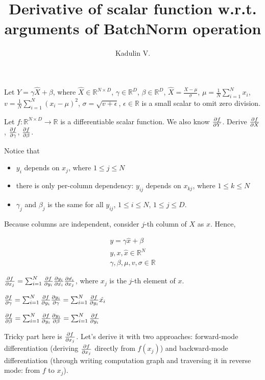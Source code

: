 \documentclass[12pt]{article}
\begin{document}
\title{Derivative of scalar function w.r.t. arguments of BatchNorm operation}
\author{Kadulin V.}
\maketitle

Let $Y = \gamma \hat{X} + \beta$, where 
$\hat{X} \in \mathbb{R}^{N \times D}$, 
$\gamma \in \mathbb{R}^D$, 
$\beta \in \mathbb{R}^D$, 
$\hat{X} = \frac{X - \mu}{\sigma}$,  
$\mu = \frac{1}{N} \sum_{i=1}^{N} x_{i}$,
$v = \frac{1}{N} \sum_{i=1}^{N} (x_i - \mu)^2$,
$\sigma = \sqrt{v + \epsilon}$,
$\epsilon \in \mathbb{R}$ is a small scalar to omit zero division. 

Let $f: \mathbb{R}^{N \times D} \rightarrow \mathbb{R}$ is a differentiable scalar function. We also know $\pdv{f}{Y}$.
Derive $\pdv{f}{X}$, $\pdv{f}{\gamma}$, $\pdv{f}{\beta}$.

Notice that
\begin{itemize}
\item $y_i$ depends on $x_j$, where $1 \le j \le N$
\item there is only per-column dependency: $y_{ij}$ depends on $x_{kj}$, where $1 \le k \le N$
\item $\gamma_j$ and $\beta_{j}$ is the same for all ${y_{ij}}$, $1 \le i \le N$, $1 \le j \le D$.
\end{itemize}

Because columns are independent, consider $j$-th column of $X$ as $x$. Hence,

\begin{equation*}
\begin{split}
y = \gamma \hat{x} + \beta \\
y, x, \hat{x} \in \mathbb{R}^N \\
\gamma, \beta, \mu, v, \sigma \in \mathbb{R}
\end{split}
\end{equation*}

$\pdv{f}{x_j} = \sum_{i=1}^{N} \pdv{f}{y_i} \pdv{y_i}{\hat{x_i}} \pdv{\hat{x_i}}{x_j}$, where $x_j$ is the $j$-th element of $x$.

$
	\pdv{f}{\gamma} = 
	\sum_{i=1}^{N} \pdv{f}{y_i} \pdv{y_i}{\gamma} = 
	\sum_{i=1}^{N} \pdv{f}{y_i} \hat{x_i}
$

$
	\pdv{f}{\beta} = 
	\sum_{i=1}^{N} \pdv{f}{y_i} \pdv{y_i}{\beta} =
	\sum_{i=1}^{N} \pdv{f}{y_i}
$

Tricky part here is $\pdv{f}{x_j}$. Let's derive it with two approaches: forward-mode differentiation (deriving $\pdv{f}{x_j}$ directly from $f(x_j)$) and backward-mode differentiation (through writing computation graph and traversing it in reverse mode: from $f$ to $x_j$).
\end{document}
